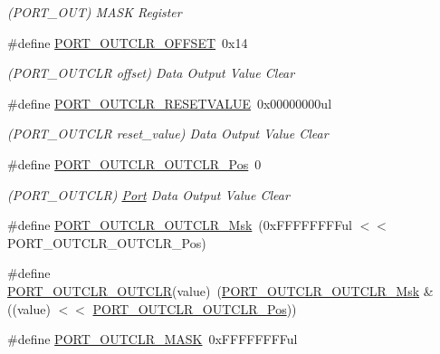 \begin{DoxyCompactItemize}
\begin{DoxyCompactList}\small\item\em (P\+O\+R\+T\+\_\+\+O\+UT) M\+A\+SK Register \end{DoxyCompactList}\item 
\#define \mbox{\hyperlink{group___s_a_m_d21___p_o_r_t_gabfa9579bd1cebd85dc745bfd430a6453}{P\+O\+R\+T\+\_\+\+O\+U\+T\+C\+L\+R\+\_\+\+O\+F\+F\+S\+ET}}~0x14
\begin{DoxyCompactList}\small\item\em (P\+O\+R\+T\+\_\+\+O\+U\+T\+C\+LR offset) Data Output Value Clear \end{DoxyCompactList}\item 
\#define \mbox{\hyperlink{group___s_a_m_d21___p_o_r_t_gad9e9f2f4052c8c9a19937ade97602106}{P\+O\+R\+T\+\_\+\+O\+U\+T\+C\+L\+R\+\_\+\+R\+E\+S\+E\+T\+V\+A\+L\+UE}}~0x00000000ul
\begin{DoxyCompactList}\small\item\em (P\+O\+R\+T\+\_\+\+O\+U\+T\+C\+LR reset\+\_\+value) Data Output Value Clear \end{DoxyCompactList}\item 
\#define \mbox{\hyperlink{group___s_a_m_d21___p_o_r_t_gaa448fb60871992079921f4c31b2ab0a0}{P\+O\+R\+T\+\_\+\+O\+U\+T\+C\+L\+R\+\_\+\+O\+U\+T\+C\+L\+R\+\_\+\+Pos}}~0
\begin{DoxyCompactList}\small\item\em (P\+O\+R\+T\+\_\+\+O\+U\+T\+C\+LR) \mbox{\hyperlink{struct_port}{Port}} Data Output Value Clear \end{DoxyCompactList}\item 
\#define \mbox{\hyperlink{group___s_a_m_d21___p_o_r_t_gaece9af6cd305c4d43772a0fbd4288de2}{P\+O\+R\+T\+\_\+\+O\+U\+T\+C\+L\+R\+\_\+\+O\+U\+T\+C\+L\+R\+\_\+\+Msk}}~(0x\+F\+F\+F\+F\+F\+F\+F\+Ful $<$$<$ P\+O\+R\+T\+\_\+\+O\+U\+T\+C\+L\+R\+\_\+\+O\+U\+T\+C\+L\+R\+\_\+\+Pos)
\item 
\#define \mbox{\hyperlink{group___s_a_m_d21___p_o_r_t_ga770d56801d959c8fb260e82d5df7ce60}{P\+O\+R\+T\+\_\+\+O\+U\+T\+C\+L\+R\+\_\+\+O\+U\+T\+C\+LR}}(value)~(\mbox{\hyperlink{group___s_a_m_d21___p_o_r_t_gaece9af6cd305c4d43772a0fbd4288de2}{P\+O\+R\+T\+\_\+\+O\+U\+T\+C\+L\+R\+\_\+\+O\+U\+T\+C\+L\+R\+\_\+\+Msk}} \& ((value) $<$$<$ \mbox{\hyperlink{group___s_a_m_d21___p_o_r_t_gaa448fb60871992079921f4c31b2ab0a0}{P\+O\+R\+T\+\_\+\+O\+U\+T\+C\+L\+R\+\_\+\+O\+U\+T\+C\+L\+R\+\_\+\+Pos}}))
\item 
\#define \mbox{\hyperlink{group___s_a_m_d21___p_o_r_t_ga600b1512b7fcc7de565adb38783650fd}{P\+O\+R\+T\+\_\+\+O\+U\+T\+C\+L\+R\+\_\+\+M\+A\+SK}}~0x\+F\+F\+F\+F\+F\+F\+F\+Ful

\end{DoxyCompactItemize}
